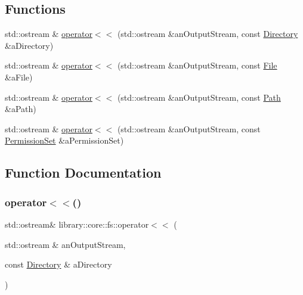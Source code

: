 \subsection*{Functions}
\begin{DoxyCompactItemize}
\item 
std\+::ostream \& \mbox{\hyperlink{namespacelibrary_1_1core_1_1fs_a53ad2f08863101b5ae694faae44f811e}{operator$<$$<$}} (std\+::ostream \&an\+Output\+Stream, const \mbox{\hyperlink{classlibrary_1_1core_1_1fs_1_1_directory}{Directory}} \&a\+Directory)
\item 
std\+::ostream \& \mbox{\hyperlink{namespacelibrary_1_1core_1_1fs_a06acb7c0054dcbe216284bdadd5663ac}{operator$<$$<$}} (std\+::ostream \&an\+Output\+Stream, const \mbox{\hyperlink{classlibrary_1_1core_1_1fs_1_1_file}{File}} \&a\+File)
\item 
std\+::ostream \& \mbox{\hyperlink{namespacelibrary_1_1core_1_1fs_a47817adc842f15a3de34925de44b2de3}{operator$<$$<$}} (std\+::ostream \&an\+Output\+Stream, const \mbox{\hyperlink{classlibrary_1_1core_1_1fs_1_1_path}{Path}} \&a\+Path)
\item 
std\+::ostream \& \mbox{\hyperlink{namespacelibrary_1_1core_1_1fs_a23e125ea54e0e902d4b7fde80237d366}{operator$<$$<$}} (std\+::ostream \&an\+Output\+Stream, const \mbox{\hyperlink{classlibrary_1_1core_1_1fs_1_1_permission_set}{Permission\+Set}} \&a\+Permission\+Set)
\end{DoxyCompactItemize}


\subsection{Function Documentation}
\mbox{\label{namespacelibrary_1_1core_1_1fs_a53ad2f08863101b5ae694faae44f811e}} 
\subsubsection{\texorpdfstring{operator$<$$<$()}{operator<<()}\hspace{0.1cm}{\footnotesize\ttfamily [1/4]}}
{\footnotesize\ttfamily std\+::ostream\& library\+::core\+::fs\+::operator$<$$<$ (\begin{DoxyParamCaption}\item[{std\+::ostream \&}]{an\+Output\+Stream,  }\item[{const \mbox{\hyperlink{classlibrary_1_1core_1_1fs_1_1_directory}{Directory}} \&}]{a\+Directory }\end{DoxyParamCaption})}



